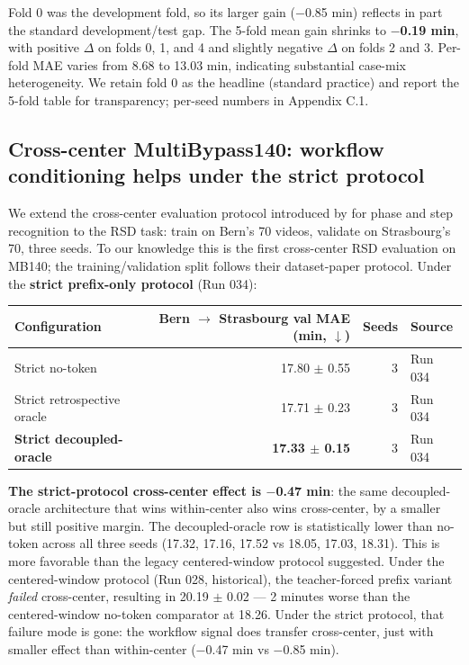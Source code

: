Fold 0 was the development fold, so its larger gain ($-$0.85 min)
reflects in part the standard development/test gap. The 5-fold mean
gain shrinks to \textbf{$-$0.19 min}, with positive $\Delta$ on folds 0, 1,
and 4 and slightly negative $\Delta$ on folds 2 and 3. Per-fold MAE varies
from 8.68 to 13.03 min, indicating substantial case-mix heterogeneity.
We retain fold 0 as the headline (standard practice) and report the
5-fold table for transparency; per-seed numbers in Appendix C.1.

\subsection{Cross-center MultiBypass140: workflow conditioning helps under the strict
protocol}\label{cross-center-multibypass140-workflow-conditioning-helps-under-the-strict-protocol}

We extend the cross-center evaluation protocol introduced by
\textbf{\citet{lavanchy2024multibypass}} for phase and step recognition to the
RSD task: train on Bern's 70 videos, validate on Strasbourg's 70, three
seeds. To our knowledge this is the first cross-center RSD evaluation on
MB140; the training/validation split follows their dataset-paper
protocol. Under the \textbf{strict prefix-only protocol} (Run 034):

\begin{longtable}[]{@{}lrrl@{}}
\toprule\noalign{}
Configuration & Bern $\rightarrow$ Strasbourg val MAE (min, $\downarrow$) & Seeds & Source \\
\midrule\noalign{}
\endhead
\bottomrule\noalign{}
\endlastfoot
Strict no-token & 17.80 $\pm$ 0.55 & 3 & Run 034 \\
Strict retrospective oracle & 17.71 $\pm$ 0.23 & 3 & Run 034 \\
\textbf{Strict decoupled-oracle} & \textbf{17.33 $\pm$ 0.15} & 3 & Run
034 \\
\end{longtable}

\textbf{The strict-protocol cross-center effect is $-$0.47 min}: the same
decoupled-oracle architecture that wins within-center also wins
cross-center, by a smaller but still positive margin. The
decoupled-oracle row is statistically lower than no-token across all
three seeds (17.32, 17.16, 17.52 vs 18.05, 17.03, 18.31). This is more favorable than the legacy centered-window protocol
suggested. Under the centered-window protocol
(Run 028, historical), the teacher-forced prefix variant \emph{failed}
cross-center, resulting in 20.19 $\pm$ 0.02 --- 2 minutes worse than the
centered-window no-token comparator at 18.26. Under the strict protocol,
that failure mode is gone: the workflow signal does transfer
cross-center, just with smaller effect than within-center ($-$0.47 min vs
$-$0.85 min).

